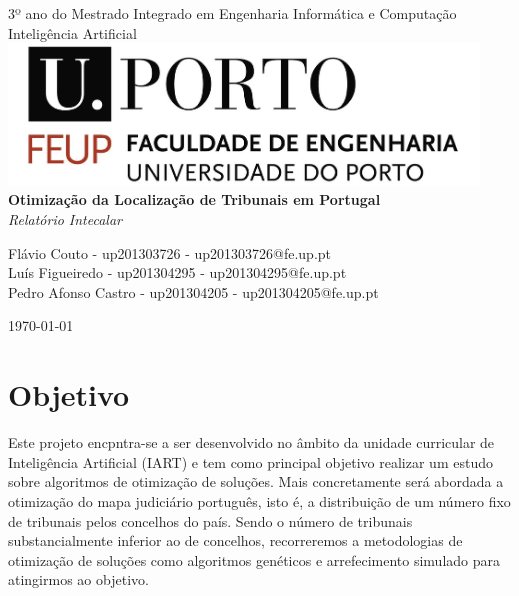 \documentclass[11pt,a4paper,reqno]{article}
\numberwithin{equation}{section}
\begin{document}
\begin{titlepage}
\begin{center}

{\large 3º ano do Mestrado Integrado em Engenharia Informática e Computação \\[5mm]}
{\Large Inteligência Artificial}\\[3cm]

\includegraphics[width=12.5cm]{feup_logo.jpg}\\[3cm]

{\Huge \bfseries Otimização da Localização de Tribunais em Portugal \\[5mm]}
{\large \textit{Relatório Intecalar} \\[2cm]}


{\large Flávio Couto - up201303726 - up201303726@fe.up.pt\\[1mm]}
{\large Luís Figueiredo - up201304295 - up201304295@fe.up.pt \\[1mm]}
{\large Pedro Afonso Castro - up201304205 - up201304205@fe.up.pt\\[1cm]}


{\large \today}

\end{center}
\end{titlepage}

\tableofcontents



\newpage

\section{Objetivo}

Este projeto encpntra-se a ser desenvolvido no âmbito da unidade curricular de Inteligência Artificial (IART) e tem como principal objetivo realizar um estudo sobre algoritmos de otimização de soluções. Mais concretamente será abordada a otimização do mapa judiciário português, isto é, a distribuição de um número fixo de tribunais pelos concelhos do país. Sendo o número de tribunais substancialmente inferior ao de concelhos, recorreremos a metodologias de otimização de soluções como algoritmos genéticos e arrefecimento simulado para atingirmos ao objetivo. 
\end{document}
